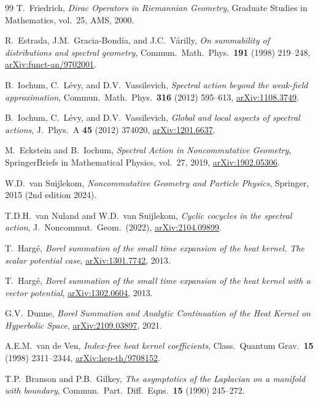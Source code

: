 \documentclass[11pt,a4paper]{article}
\theoremstyle{plain}
\theoremstyle{definition}
\begin{document}
\begin{thebibliography}{99}
T.~Friedrich,
\textit{Dirac Operators in Riemannian Geometry},
Graduate Studies in Mathematics, vol.~25, AMS, 2000.

R.~Estrada, J.M.~Gracia-Bond\'{i}a, and J.C.~V\'{a}rilly,
\textit{On summability of distributions and spectral geometry},
Commun.\ Math.\ Phys.\ \textbf{191} (1998) 219--248,
\href{https://arxiv.org/abs/funct-an/9702001}{arXiv:funct-an/9702001}.

B.~Iochum, C.~L\'{e}vy, and D.V.~Vassilevich,
\textit{Spectral action beyond the weak-field approximation},
Commun.\ Math.\ Phys.\ \textbf{316} (2012) 595--613,
\href{https://arxiv.org/abs/1108.3749}{arXiv:1108.3749}.

B.~Iochum, C.~L\'{e}vy, and D.V.~Vassilevich,
\textit{Global and local aspects of spectral actions},
J.\ Phys.\ A \textbf{45} (2012) 374020,
\href{https://arxiv.org/abs/1201.6637}{arXiv:1201.6637}.

M.~Eckstein and B.~Iochum,
\textit{Spectral Action in Noncommutative Geometry},
SpringerBriefs in Mathematical Physics, vol.~27, 2019,
\href{https://arxiv.org/abs/1902.05306}{arXiv:1902.05306}.

W.D.~van Suijlekom,
\textit{Noncommutative Geometry and Particle Physics},
Springer, 2015 (2nd edition 2024).

T.D.H.~van Nuland and W.D.~van Suijlekom,
\textit{Cyclic cocycles in the spectral action},
J.\ Noncommut.\ Geom.\ (2022),
\href{https://arxiv.org/abs/2104.09899}{arXiv:2104.09899}.

T.~Harg\'{e},
\textit{Borel summation of the small time expansion of the heat kernel.
The scalar potential case},
\href{https://arxiv.org/abs/1301.7742}{arXiv:1301.7742}, 2013.

T.~Harg\'{e},
\textit{Borel summation of the small time expansion of the heat kernel
with a vector potential},
\href{https://arxiv.org/abs/1302.0604}{arXiv:1302.0604}, 2013.

G.V.~Dunne,
\textit{Borel Summation and Analytic Continuation of the Heat Kernel
on Hyperbolic Space},
\href{https://arxiv.org/abs/2109.03897}{arXiv:2109.03897}, 2021.

A.E.M.~van de Ven,
\textit{Index-free heat kernel coefficients},
Class.\ Quantum Grav.\ \textbf{15} (1998) 2311--2344,
\href{https://arxiv.org/abs/hep-th/9708152}{arXiv:hep-th/9708152}.

T.P.~Branson and P.B.~Gilkey,
\textit{The asymptotics of the Laplacian on a manifold with boundary},
Commun.\ Part.\ Diff.\ Eqns.\ \textbf{15} (1990) 245--272.


\end{thebibliography}
\end{document}
